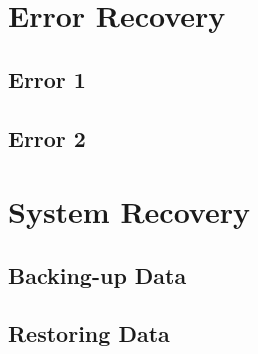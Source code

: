 \section{Error Recovery}

\subsection{Error 1}

\subsection{Error 2}

\section{System Recovery}

\subsection{Backing-up Data}

\subsection{Restoring Data}